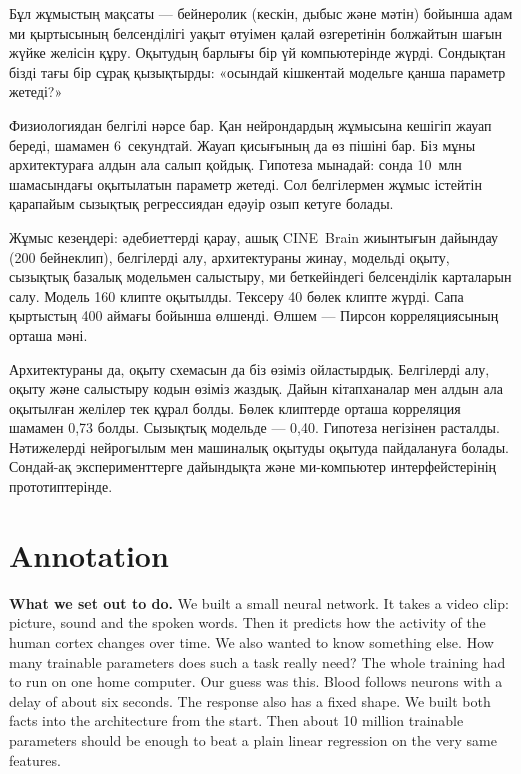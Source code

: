 \documentclass[12pt,a4paper]{article}
\begin{document}
Бұл жұмыстың мақсаты — бейнеролик (кескін, дыбыс және мәтін) бойынша
адам ми қыртысының белсенділігі уақыт өтуімен қалай өзгеретінін
болжайтын шағын жүйке желісін құру. Оқытудың барлығы бір үй
компьютерінде жүрді. Сондықтан бізді тағы бір сұрақ қызықтырды:
«осындай кішкентай модельге қанша параметр жетеді?»

Физиологиядан белгілі нәрсе бар. Қан нейрондардың жұмысына кешігіп
жауап береді, шамамен 6~секундтай. Жауап қисығының да өз пішіні бар.
Біз мұны архитектураға алдын ала салып қойдық. Гипотеза мынадай: сонда
10~млн шамасындағы оқытылатын параметр жетеді. Сол белгілермен жұмыс
істейтін қарапайым сызықтық регрессиядан едәуір озып кетуге болады.

Жұмыс кезеңдері: әдебиеттерді қарау, ашық CINE~Brain жиынтығын
дайындау (200 бейнеклип), белгілерді алу, архитектураны жинау, модельді
оқыту, сызықтық базалық модельмен салыстыру, ми беткейіндегі
белсенділік карталарын салу. Модель 160 клипте оқытылды. Тексеру 40
бөлек клипте жүрді. Сапа қыртыстың 400 аймағы бойынша өлшенді. Өлшем —
Пирсон корреляциясының орташа мәні.

Архитектураны да, оқыту схемасын да біз өзіміз ойластырдық. Белгілерді
алу, оқыту және салыстыру кодын өзіміз жаздық. Дайын кітапханалар мен
алдын ала оқытылған желілер тек құрал болды. Бөлек клиптерде орташа
корреляция шамамен 0,73 болды. Сызықтық модельде — 0,40. Гипотеза
негізінен расталды. Нәтижелерді нейрогылым мен машиналық оқытуды
оқытуда пайдалануға болады. Сондай-ақ эксперименттерге дайындықта және
ми-компьютер интерфейстерінің прототиптерінде.

\section*{Annotation}

\textbf{What we set out to do.} We built a small neural network. It
takes a video clip: picture, sound and the spoken words. Then it
predicts how the activity of the human cortex changes over time. We
also wanted to know something else. How many trainable parameters does
such a task really need? The whole training had to run on one home
computer. Our guess was this. Blood follows neurons with a delay of
about six seconds. The response also has a fixed shape. We built both
facts into the architecture from the start. Then about 10 million
trainable parameters should be enough to beat a plain linear regression
on the very same features.
\end{document}
